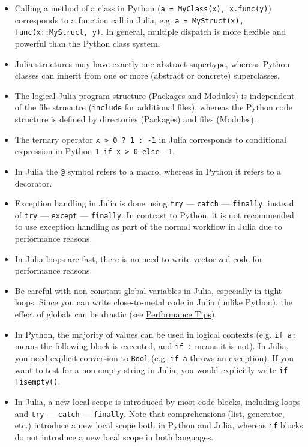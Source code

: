 \begin{itemize}
\item Calling a method of a class in Python (\texttt{a = MyClass(x), x.func(y)}) corresponds to a function call in Julia, e.g. \texttt{a = MyStruct(x), func(x::MyStruct, y)}. In general, multiple dispatch is more flexible and powerful than the Python class system.


\item Julia structures may have exactly one abstract supertype, whereas Python classes can inherit from one or more (abstract or concrete) superclasses.


\item The logical Julia program structure (Packages and Modules) is independent of the file strucutre (\texttt{include} for additional files), whereas the Python code structure is defined by directories (Packages) and files (Modules).


\item The ternary operator \texttt{x > 0 ? 1 : -1} in Julia corresponds to conditional expression in Python \texttt{1 if x > 0 else -1}.


\item In Julia the \texttt{@} symbol refers to a macro, whereas in Python it refers to a decorator.


\item Exception handling in Julia is done using \texttt{try} — \texttt{catch} — \texttt{finally}, instead of \texttt{try} — \texttt{except} — \texttt{finally}. In contrast to Python, it is not recommended to use exception handling as part of the normal workflow in Julia due to performance reasons.


\item In Julia loops are fast, there is no need to write {\textquotedbl}vectorized{\textquotedbl} code for performance reasons.


\item Be careful with non-constant global variables in Julia, especially in tight loops. Since you can write close-to-metal code in Julia (unlike Python), the effect of globals can be drastic (see \hyperlink{818954303942149020}{Performance Tips}).


\item In Python, the majority of values can be used in logical contexts (e.g. \texttt{if {\textquotedbl}a{\textquotedbl}:} means the following block is executed, and \texttt{if {\textquotedbl}{\textquotedbl}:} means it is not). In Julia, you need explicit conversion to \texttt{Bool} (e.g. \texttt{if {\textquotedbl}a{\textquotedbl}} throws an exception). If you want to test for a non-empty string in Julia, you would explicitly write \texttt{if !isempty({\textquotedbl}{\textquotedbl})}.


\item In Julia, a new local scope is introduced by most code blocks, including loops and \texttt{try} — \texttt{catch} — \texttt{finally}. Note that comprehensions (list, generator, etc.) introduce a new local scope both in Python and Julia, whereas \texttt{if} blocks do not introduce a new local scope in both languages.

\end{itemize}


